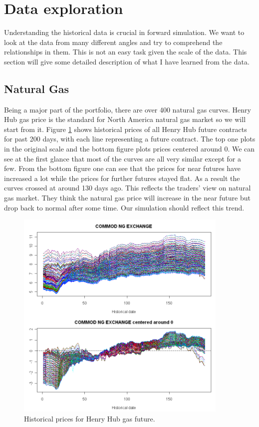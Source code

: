 \section{Data exploration}
Understanding the historical data is crucial in forward simulation. 
We want to look at the data from many different angles and try to 
comprehend the relationships in them. This is not an easy task
given the scale of the data. This section will give some detailed
description of what I have learned from the data. 

\subsection{Natural Gas}
Being a major part of the portfolio, 
there are over 400 natural gas curves. 
Henry Hub gas price is the standard for
North America natural gas market so we will start 
from it. Figure \ref{henry-hist} shows historical prices of all
Henry Hub future contracts for past 200 days, with
each line representing a future contract. The top one plots 
in the original scale and the bottom figure plots prices 
centered around 0. We can see at the first glance that 
most of the curves are all very similar except for a few.
From the bottom figure one can see that the prices for
near futures have increased a lot while the prices for 
further futures stayed flat. As a result the curves crossed 
at around 130 days ago. This reflects the traders' view on natural
gas market. They think the natural gas price will increase in the
near future but drop back to normal after some time. Our 
simulation should reflect this trend. 
\begin{figure}[htbp]
\centering
\includegraphics[width=4in, height=4in]{figures/henry01.png}
\caption{Historical prices for Henry Hub gas future.}
\label{henry-hist}
\end{figure}

